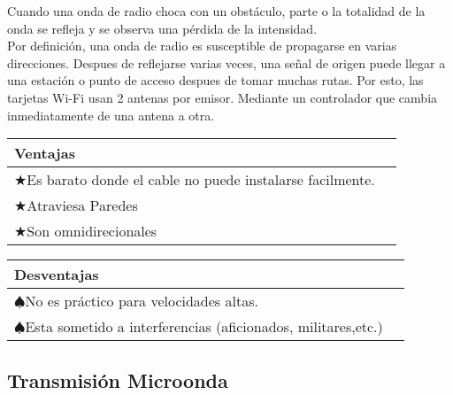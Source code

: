 Cuando una onda de radio choca con un obstáculo, parte o la totalidad de la onda se refleja y se observa una pérdida de la intensidad. \\ ${ }$ \\ Por definición, una onda de radio es susceptible de propagarse en varias direcciones. Despues de reflejarse varias veces, una señal de origen puede llegar a una estación o punto de acceso despues de tomar muchas rutas. Por esto, las tarjetas Wi-Fi usan 2 antenas por emisor. Mediante un controlador que cambia inmediatamente de una antena a otra.


\begin{center}
\begin{tabular}{*2l}
\toprule
Ventajas &   {} \\
\midrule\hspace{-0.4cm} \makecell{$\bigstar$Es barato donde el cable\\no puede instalarse facilmente.}    \\
$\bigstar$Atraviesa Paredes   \\
$\bigstar$Son omnidirecionales  \\
\bottomrule
\end{tabular}
\quad
\begin{tabular}{*2l}
\toprule
Desventajas &   {} \\
\midrule
\hspace{-1.7cm} \makecell{$\spadesuit$No es práctico para\\ velocidades altas.}  \\
\makecell{$\spadesuit$Esta sometido a interferencias\\ (aficionados, militares,etc.)}\\
\bottomrule
\end{tabular}
\end{center}

\subsection*{Transmisión Microonda}

